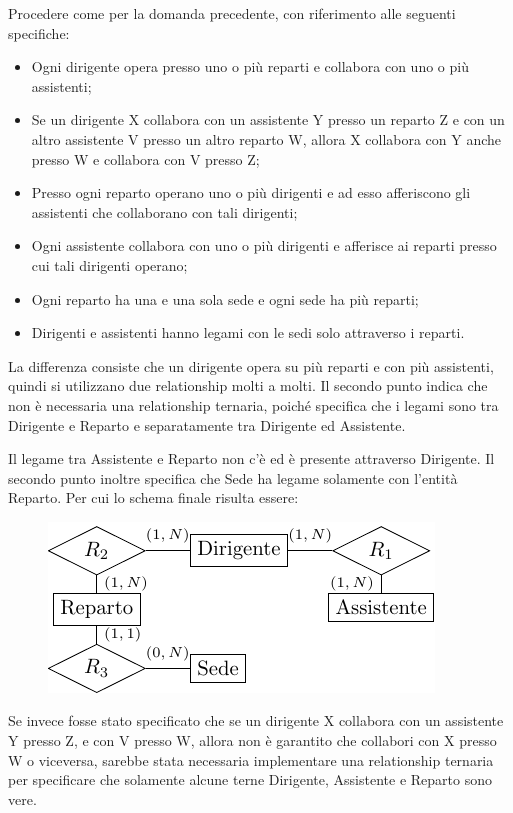 \documentclass{article}
\begin{document}
Procedere come per la domanda precedente, con riferimento alle seguenti specifiche:
\begin{itemize}
    \item Ogni dirigente opera presso uno o più reparti e collabora con uno o più assistenti;
    \item Se un dirigente X collabora con un assistente Y presso un reparto Z e con un altro assistente V presso un
    altro reparto W, allora X collabora con Y anche presso W e collabora con V presso Z;
    \item Presso ogni reparto operano uno o più dirigenti e ad esso afferiscono gli assistenti che collaborano con tali
    dirigenti;
    \item Ogni assistente collabora con uno o più dirigenti e afferisce ai reparti presso cui tali dirigenti operano;
    \item Ogni reparto ha una e una sola sede e ogni sede ha più reparti;
    \item Dirigenti e assistenti hanno legami con le sedi solo attraverso i reparti. 
\end{itemize}

La differenza consiste che un dirigente opera su più reparti e con più assistenti, quindi si utilizzano due relationship molti a molti. Il secondo punto indica che non è necessaria una relationship ternaria, poiché specifica che i legami sono tra Dirigente e Reparto e separatamente tra Dirigente ed Assistente. 

Il legame tra Assistente e Reparto non c'è ed è presente attraverso Dirigente. Il secondo punto inoltre specifica che Sede ha legame solamente con l'entità Reparto. Per cui lo schema finale risulta essere:

\begin{figure}[H]%
    \centering%
    \includegraphics[scale=1.2]{schema_6_16-12-24.pdf}%
\end{figure}


Se invece fosse stato specificato che se un dirigente X collabora con un assistente Y presso Z, e con V presso W, allora non è garantito che collabori con X presso W o viceversa, sarebbe stata necessaria implementare una relationship ternaria per specificare che solamente alcune terne Dirigente, Assistente e Reparto sono vere. 
\end{document}
